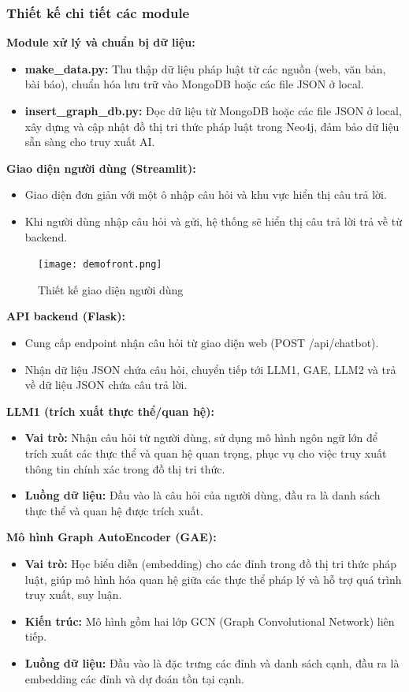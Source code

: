 \documentclass[a4paper]{article}
\begin{document}
\subsubsection{Thiết kế chi tiết các module}
\textbf{Module xử lý và chuẩn bị dữ liệu:} 
\begin{itemize}
    \item \textbf{make\_data.py:} Thu thập dữ liệu pháp luật từ các nguồn (web, văn bản, bài báo), chuẩn hóa lưu trữ vào MongoDB hoặc các file JSON ở local.
    \item \textbf{insert\_graph\_db.py:} Đọc dữ liệu từ MongoDB hoặc các file JSON ở local, xây dựng và cập nhật đồ thị tri thức pháp luật trong Neo4j, đảm bảo dữ liệu sẵn sàng cho truy xuất AI.
\end{itemize}
\textbf{Giao diện người dùng (Streamlit):}
\begin{itemize}
    \item Giao diện đơn giản với một ô nhập câu hỏi và khu vực hiển thị câu trả lời.
    \item Khi người dùng nhập câu hỏi và gửi, hệ thống sẽ hiển thị câu trả lời trả về từ backend.
    
\end{itemize}
\begin{figure}[H]
    \centering
    \texttt{[image: demofront.png]}
    \caption{Thiết kế giao diện người dùng}

\end{figure}
\textbf{API backend (Flask):}
\begin{itemize}
    \item Cung cấp endpoint nhận câu hỏi từ giao diện web (POST /api/chatbot).
    \item Nhận dữ liệu JSON chứa câu hỏi, chuyển tiếp tới LLM1, GAE, LLM2 và trả về dữ liệu JSON chứa câu trả lời.
\end{itemize}
\textbf{LLM1 (trích xuất thực thể/quan hệ):}
\begin{itemize}
    \item \textbf{Vai trò:} Nhận câu hỏi từ người dùng, sử dụng mô hình ngôn ngữ lớn để trích xuất các thực thể và quan hệ quan trọng, phục vụ cho việc truy xuất thông tin chính xác trong đồ thị tri thức.
    \item \textbf{Luồng dữ liệu:} Đầu vào là câu hỏi của người dùng, đầu ra là danh sách thực thể và quan hệ được trích xuất.
\end{itemize}
\textbf{Mô hình Graph AutoEncoder (GAE):}
\begin{itemize}
    \item \textbf{Vai trò:} Học biểu diễn (embedding) cho các đỉnh trong đồ thị tri thức pháp luật, giúp mô hình hóa quan hệ giữa các thực thể pháp lý và hỗ trợ quá trình truy xuất, suy luận.
    \item \textbf{Kiến trúc:} Mô hình gồm hai lớp GCN (Graph Convolutional Network) liên tiếp.
    \item \textbf{Luồng dữ liệu:} Đầu vào là đặc trưng các đỉnh và danh sách cạnh, đầu ra là embedding các đỉnh và dự đoán tồn tại cạnh.
\end{itemize}
\end{document}
